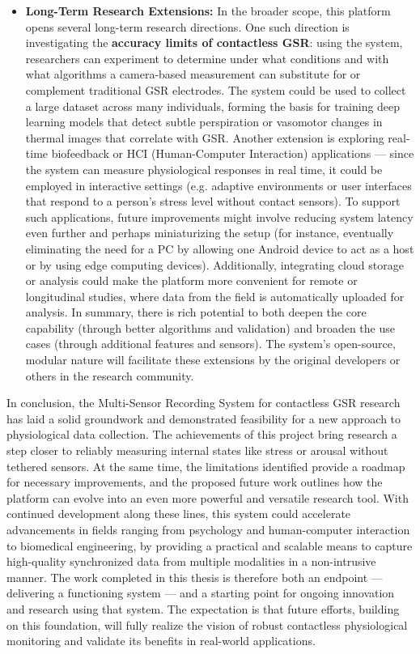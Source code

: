 \begin{itemize}
\item \textbf{Long-Term Research Extensions:} In the broader scope, this platform
  opens several long-term research directions. One such direction is
  investigating the \textbf{accuracy limits of contactless GSR}: using the
  system, researchers can experiment to determine under what conditions
  and with what algorithms a camera-based measurement can substitute for
  or complement traditional GSR electrodes. The system could be used to
  collect a large dataset across many individuals, forming the basis for
  training deep learning models that detect subtle perspiration or
  vasomotor changes in thermal images that correlate with GSR. Another
  extension is exploring real-time biofeedback or HCI (Human-Computer
  Interaction) applications --- since the system can measure
  physiological responses in real time, it could be employed in
  interactive settings (e.g. adaptive environments or user interfaces
  that respond to a person's stress level without contact sensors). To
  support such applications, future improvements might involve reducing
  system latency even further and perhaps miniaturizing the setup (for
  instance, eventually eliminating the need for a PC by allowing one
  Android device to act as a host or by using edge computing devices).
  Additionally, integrating cloud storage or analysis could make the
  platform more convenient for remote or longitudinal studies, where
  data from the field is automatically uploaded for analysis. In
  summary, there is rich potential to both deepen the core capability
  (through better algorithms and validation) and broaden the use cases
  (through additional features and sensors). The system's open-source,
  modular nature will facilitate these extensions by the original
  developers or others in the research community.

\end{itemize}
In conclusion, the Multi-Sensor Recording System for contactless GSR
research has laid a solid groundwork and demonstrated feasibility for a
new approach to physiological data collection. The achievements of this
project bring research a step closer to reliably measuring internal
states like stress or arousal without tethered sensors. At the same
time, the limitations identified provide a roadmap for necessary
improvements, and the proposed future work outlines how the platform can
evolve into an even more powerful and versatile research tool. With
continued development along these lines, this system could accelerate
advancements in fields ranging from psychology and human-computer
interaction to biomedical engineering, by providing a practical and
scalable means to capture high-quality synchronized data from multiple
modalities in a non-intrusive manner. The work completed in this thesis
is therefore both an endpoint --- delivering a functioning system --- and
a starting point for ongoing innovation and research using that system.
The expectation is that future efforts, building on this foundation,
will fully realize the vision of robust contactless physiological
monitoring and validate its benefits in real-world applications.
